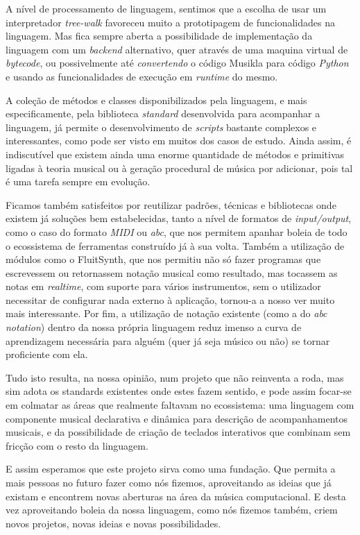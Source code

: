 A nível de processamento de linguagem, sentimos que a escolha de usar um interpretador \textit{tree-walk} favoreceu muito a prototipagem de funcionalidades na linguagem. Mas fica sempre aberta a possibilidade de implementação da linguagem com um \textit{backend} alternativo, quer através de uma maquina virtual de \textit{bytecode}, ou possivelmente até \textit{convertendo} o código Musikla para código \textit{Python} e usando as funcionalidades de execução em \textit{runtime} do mesmo.

A coleção de métodos e classes disponibilizados pela linguagem, e mais especificamente, pela biblioteca \textit{standard} desenvolvida para acompanhar a linguagem, já permite o desenvolvimento de \textit{scripts} bastante complexos e interessantes, como pode ser visto em muitos dos casos de estudo. Ainda assim, é indiscutível que existem ainda uma enorme quantidade de métodos e primitivas ligadas à teoria musical ou à geração procedural de música por adicionar, pois tal é uma tarefa sempre em evolução.

Ficamos também satisfeitos por reutilizar padrões, técnicas e bibliotecas onde existem já soluções bem estabelecidas, tanto a nível de formatos de \textit{input/output}, como o caso do formato \textit{MIDI} ou \textit{abc}, que nos permitem apanhar boleia de todo o ecossistema de ferramentas construído já à sua volta. Também a utilização de módulos como o FluitSynth, que nos permitiu não só fazer programas que escrevessem ou retornassem notação musical como resultado, mas tocassem as notas em \textit{realtime}, com suporte para vários instrumentos, sem o utilizador necessitar de configurar nada externo à aplicação, tornou-a a nosso ver muito mais interessante. Por fim, a utilização de notação existente (como a do \textit{abc notation}) dentro da nossa própria linguagem reduz imenso a curva de aprendizagem necessária para alguém (quer já seja músico ou não) se tornar proficiente com ela.

Tudo isto resulta, na nossa opinião, num projeto que não reinventa a roda, mas sim adota os standards existentes onde estes fazem sentido, e pode assim focar-se em colmatar as áreas que realmente faltavam no ecossistema: uma linguagem com componente musical declarativa e dinâmica para descrição de acompanhamentos musicais, e da possibilidade de criação de teclados interativos que combinam sem fricção com o resto da linguagem. 

E assim esperamos que este projeto sirva como uma fundação. Que permita a mais pessoas no futuro fazer como nós fizemos, aproveitando as ideias que já existam e encontrem novas aberturas na área da música computacional. E desta vez aproveitando boleia da nossa linguagem, como nós fizemos também, criem novos projetos, novas ideias e novas possibilidades.

